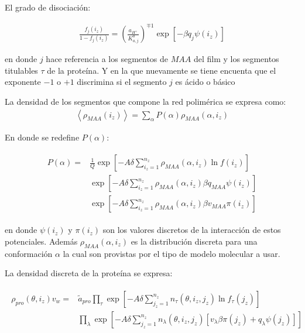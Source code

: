 El grado de disociaci\'on:

\begin{align}
	\frac{f_j(i_z)}{1-f_j(i_z)} = \left(\frac{a_{H^+}}{K^0_{a,j}}\right)^{\mp 1} \exp[-\beta q_j \psi(i_z)]
\end{align}

\noindent en donde $j$ hace referencia a los segmentos de $MAA$ del film y los segmentos titulables $\tau$ de la prote\'ina. Y en la que nuevamente se tiene encuenta que el exponente $-1$ o $+1$ discrimina si el segmento $j$ es \'acido o b\'asico


La densidad de los segmentos que compone la red polim\'erica se expresa como:
\begin{align}
	\left< \rho_{MAA}(i_z)\right> = \sum_\alpha P(\alpha)\rho_{MAA}(\alpha, i_z)
\end{align}

En donde se redefine $P(\alpha)$:


\begin{align}
	\begin{aligned}
		P(\alpha) = &\frac{1}{Q}\exp\left[ -A \delta \sum^{n_z}_{i_z = 1} \rho_{MAA}(\alpha, i_z) \ln f(i_z)\right] \\
		&\exp\left[ -A\delta \sum^{n_z}_{i_z = 1}  \rho_{MAA}(\alpha, i_z) \beta q_{MAA} \psi(i_z)\right] \\
		& \exp\left[ -A\delta \sum^{n_z}_{i_z = 1}  \rho_{MAA}(\alpha, i_z) \beta v_{MAA} \pi(i_z)\right] 
	\end{aligned}
\end{align}

\noindent en donde $\psi(i_z)$ y $\pi(i_z)$ son los valores discretos de la interacci\'on de estos potenciales. Adem\'as $\rho_{MAA}(\alpha, i_z)$ es la distribuci\'on discreta para una conformaci\'on $\alpha$ la cual son provistas por el tipo de modelo molecular a usar.

La densidad discreta de la prote\'ina se expresa:


\begin{align}
	\begin{aligned}
		\rho_{pro}(\theta, i_z)v_w = &\tilde{a}_{pro} \prod_\tau\exp\left[-A \delta \sum^{n_z}_{j_z = 1} n_\tau(\theta,i_z,j_z) \ln f_\tau(j_z)\right] \\
		& \prod_\lambda \exp \left[-A \delta \sum^{n_z}_{j_z = 1}  n_\lambda(\theta,i_z, j_z)[v_\lambda\beta\pi(j_z) + q_\lambda \psi(j_z)] \right]
	\end{aligned}
\end{align}

